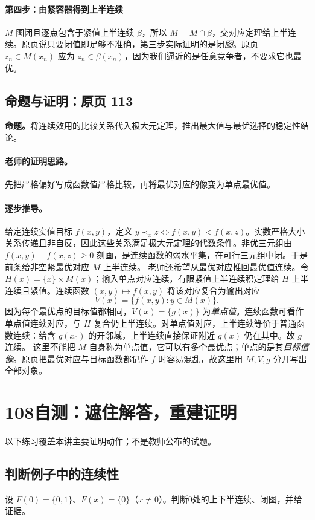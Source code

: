 \documentclass[11pt,a4paper]{article}
\theoremstyle{definition}\newtheorem{definition}{定义}\newtheorem{example}{例}
\begin{document}
\paragraph{第四步：由紧容器得到上半连续}
$M$ 图闭且逐点包含于紧值上半连续 $\beta$，所以 $M=M\cap\beta$，交对应定理给上半连续。原页说只要闭值即足够不准确，第三步实际证明的是闭\emph{图}。原页 $z_n\in M(x_n)$ 应为 $z_n\in\beta(x_n)$，因为我们逼近的是任意竞争者，不要求它也最优。


\subsection{命题与证明：原页 113}

\textbf{命题。}将连续效用的比较关系代入极大元定理，推出最大值与最优选择的稳定性结论。

\paragraph{老师的证明思路。}先把严格偏好写成函数值严格比较，再将最优对应的像变为单点最优值。

\paragraph{逐步推导。}
给定连续实值目标 $f(x,y)$，定义 $y\prec_x z\iff f(x,y)<f(x,z)$。实数严格大小关系传递且非自反，因此这些关系满足极大元定理的代数条件。非优三元组由 $f(x,y)-f(x,z)\ge0$ 刻画，是连续函数的弱水平集，在可行三元组中闭。于是前条给非空紧最优对应 $M$ 上半连续。
老师还希望从最优对应推回最优值连续。令 $H(x)=\{x\}\times M(x)$；输入单点对应连续，有限紧值上半连续积定理给 $H$ 上半连续且紧值。连续函数 $(x,y)\mapsto f(x,y)$ 将该对应复合为输出对应
\[V(x)=\{f(x,y):y\in M(x)\}.\]
因为每个最优点的目标值都相同，$V(x)=\{g(x)\}$ 为\emph{单点值}。连续函数可看作单点值连续对应，与 $H$ 复合仍上半连续。对单点值对应，上半连续等价于普通函数连续：给含 $g(x_0)$ 的开邻域，上半连续直接保证附近 $g(x)$ 仍在其中。故 $g$ 连续。
这里不能把 $M$ 自身称为单点值，它可以有多个最优点；单点的是其\emph{目标值像}。原页把最优对应与目标函数都记作 $f$ 时容易混乱，故这里用 $M,V,g$ 分开写出全部对象。


\clearpage\section{108自测：遮住解答，重建证明}
以下练习覆盖本讲主要证明动作；不是教师公布的试题。
\subsection{判断例子中的连续性}
设 $F(0)=\{0,1\}$、$F(x)=\{0\}$（$x\ne0$）。判断0处的上下半连续、闭图，并给证据。
\end{document}
